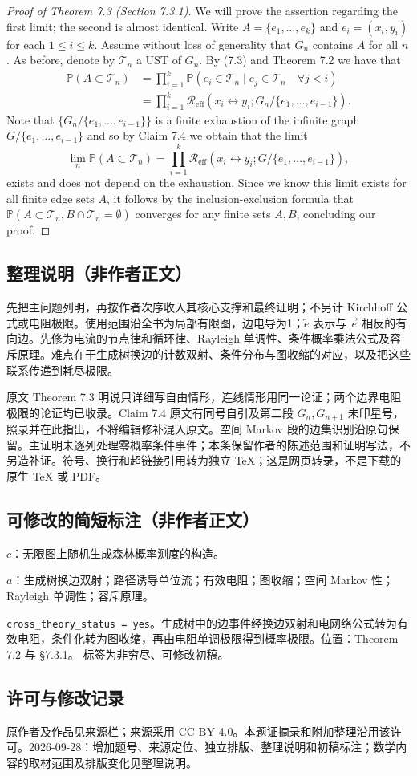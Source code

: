 \documentclass[UTF8,11pt]{ctexart}
\theoremstyle{definition}
\newcommand{\Prob}{\mathbb P}
\newcommand{\Reff}{\mathcal R_{\mathrm{eff}}}
\begin{document}
\begin{proof}[Proof of Theorem 7.3 (Section 7.3.1)]
We will prove the assertion regarding the first limit; the second is almost identical. Write $A=\{e_1,\ldots,e_k\}$ and $e_i=(x_i,y_i)$ for each $1\le i\le k$. Assume without loss of generality that $G_n$ contains $A$ for all $n$. As before, denote by $\mathcal T_n$ a UST of $G_n$. By (7.3) and Theorem 7.2 we have that
\begin{align*}
\Prob(A\subset\mathcal T_n)
&=\prod_{i=1}^k\Prob(e_i\in\mathcal T_n\mid e_j\in\mathcal T_n\quad\forall j<i)\\
&=\prod_{i=1}^k\Reff(x_i\leftrightarrow y_i;G_n/\{e_1,\ldots,e_{i-1}\}).
\end{align*}
Note that $\{G_n/\{e_1,\ldots,e_{i-1}\}\}$ is a finite exhaustion of the infinite graph $G/\{e_1,\ldots,e_{i-1}\}$ and so by Claim 7.4 we obtain that the limit
\[
\lim_n\Prob(A\subset\mathcal T_n)
=\prod_{i=1}^k\Reff(x_i\leftrightarrow y_i;G/\{e_1,\ldots,e_{i-1}\}),
\]
exists and does not depend on the exhaustion.
Since we know this limit exists for all finite edge sets $A$, it follows by the inclusion-exclusion formula that $\Prob(A\subset\mathcal T_n,B\cap\mathcal T_n=\emptyset)$ converges for any finite sets $A,B$, concluding our proof.
\end{proof}
\subsection*{整理说明（非作者正文）}
先把主问题列明，再按作者次序收入其核心支撑和最终证明；不另计 Kirchhoff 公式或电阻极限。使用范围沿全书为局部有限图，边电导为1；$\overleftarrow e$ 表示与 $\vec e$ 相反的有向边。先修为电流的节点律和循环律、Rayleigh 单调性、条件概率乘法公式及容斥原理。难点在于生成树换边的计数双射、条件分布与图收缩的对应，以及把这些联系传递到耗尽极限。

原文 Theorem 7.3 明说只详细写自由情形，连线情形用同一论证；两个边界电阻极限的论证均已收录。Claim 7.4 原文有同号自引及第二段 $G_n,G_{n+1}$ 未印星号，照录并在此指出，不将编辑修补混入原文。空间 Markov 段的边集识别沿原句保留。主证明未逐列处理零概率条件事件；本条保留作者的陈述范围和证明写法，不另造补证。符号、换行和超链接引用转为独立 TeX；这是网页转录，不是下载的原生 TeX 或 PDF。
\subsection*{可修改的简短标注（非作者正文）}
$c$：无限图上随机生成森林概率测度的构造。

$a$：生成树换边双射；路径诱导单位流；有效电阻；图收缩；空间 Markov 性；Rayleigh 单调性；容斥原理。

\texttt{cross\_theory\_status = yes}。生成树中的边事件经换边双射和电网络公式转为有效电阻，条件化转为图收缩，再由电阻单调极限得到概率极限。位置：Theorem 7.2 与 \S7.3.1。
标签为非穷尽、可修改初稿。
\subsection*{许可与修改记录}
原作者及作品见来源栏；来源采用 CC BY 4.0。本题证摘录和附加整理沿用该许可。2026-09-28：增加题号、来源定位、独立排版、整理说明和初稿标注；数学内容的取材范围及排版变化见整理说明。
\end{document}

